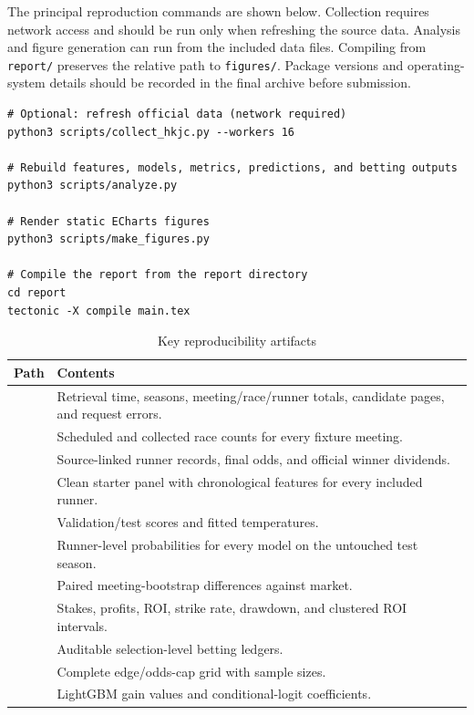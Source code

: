 The principal reproduction commands are shown below. Collection requires network access and should be run only when refreshing the source data. Analysis and figure generation can run from the included data files. Compiling from \texttt{report/} preserves the relative path to \texttt{figures/}. Package versions and operating-system details should be recorded in the final archive before submission.

\begin{verbatim}
# Optional: refresh official data (network required)
python3 scripts/collect_hkjc.py --workers 16

# Rebuild features, models, metrics, predictions, and betting outputs
python3 scripts/analyze.py

# Render static ECharts figures
python3 scripts/make_figures.py

# Compile the report from the report directory
cd report
tectonic -X compile main.tex
\end{verbatim}

\begin{table}[htbp]
\centering
\caption{Key reproducibility artifacts}\label{tab:artifacts}
\small
\begin{tabularx}{\textwidth}{L{5.6cm} Y}
\toprule
\textbf{Path} & \textbf{Contents} \\
\midrule
{} & Retrieval time, seasons, meeting/race/runner totals, candidate pages, and request errors. \\
 & Scheduled and collected race counts for every fixture meeting. \\
 & Source-linked runner records, final odds, and official winner dividends. \\
 & Clean starter panel with chronological features for every included runner. \\
 & Validation/test scores and fitted temperatures. \\
 & Runner-level probabilities for every model on the untouched test season. \\
 & Paired meeting-bootstrap differences against market. \\
 & Stakes, profits, ROI, strike rate, drawdown, and clustered ROI intervals. \\
 & Auditable selection-level betting ledgers. \\
 & Complete edge/odds-cap grid with sample sizes. \\
 & LightGBM gain values and conditional-logit coefficients. \\
\bottomrule
\end{tabularx}
\end{table}
